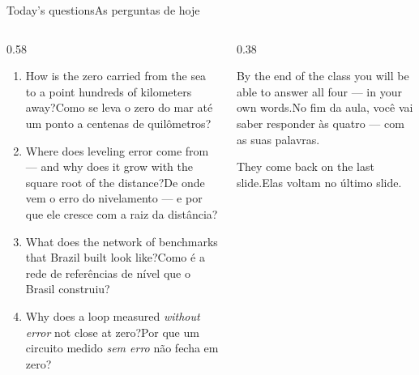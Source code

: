 \documentclass[aspectratio=169,11pt]{beamer}
\newcommand{\tr}[2]{\ifEN#2\else#1\fi}
\begin{document}
\begin{frame}{\tr{As perguntas de hoje}{Today's questions}}
  \begin{columns}[T]
    \begin{column}{0.58\textwidth}
      \begin{enumerate}
        \setlength{\itemsep}{8pt}
        \item \tr{Como se leva o zero do mar até um ponto a centenas de quilômetros?}{How is the
              zero carried from the sea to a point hundreds of kilometers away?}
        \item \tr{De onde vem o erro do nivelamento --- e por que ele cresce com a raiz da
              distância?}{Where does leveling error come from --- and why does it grow with the
              square root of the distance?}
        \item \tr{Como é a rede de referências de nível que o Brasil construiu?}{What does the
              network of benchmarks that Brazil built look like?}
        \item \tr{Por que um circuito medido \emph{sem erro} não fecha em zero?}{Why does a
              loop measured \emph{without error} not close at zero?}
      \end{enumerate}
    \end{column}
    \begin{column}{0.38\textwidth}
      \begin{ideia}[title={\tr{Combinado}{Deal}}]
        \tr{No fim da aula, você vai saber responder às quatro --- com as suas
        palavras.}{By the end of the class you will be able to answer all four --- in your own
        words.}
        \medskip

        \tr{Elas voltam no último slide.}{They come back on the last slide.}
      \end{ideia}
    \end{column}
  \end{columns}
\end{frame}
\end{document}
